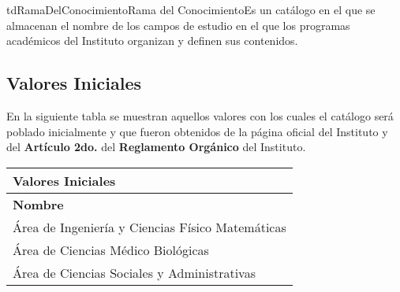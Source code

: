 \begin{TipoDeDato}{tdRamaDelConocimiento}{Rama del Conocimiento}{Es un catálogo en  el que se almacenan el nombre de los campos de estudio en el que los programas académicos del Instituto organizan y definen sus contenidos.}
	
	\begin{tdAtributos}
	\end{tdAtributos}

	\subsection{Valores Iniciales}
	
	En la siguiente tabla se muestran aquellos valores con los cuales el catálogo será poblado inicialmente y que fueron obtenidos de la página oficial del Instituto y del \textbf{Artículo 2do.} del \textbf{Reglamento Orgánico} del Instituto.
		
		\begin{longtable}{| p{}| }
	 			\rowcolor{colorPrincipal}
	 			\bf \color{white} Valores Iniciales\\
	 			\hline
	 			\rowcolor{colorSecundario}
	 			\bf \color{white} Nombre  \\
	 			\hline
	 			\hline
	 			Área de Ingeniería y Ciencias Físico Matemáticas\\
	 			\hline
	 			Área de Ciencias Médico Biológicas\\
	 			\hline
	 			Área de Ciencias Sociales y Administrativas\\
	 			\hline
	 		\end{longtable}
\end{TipoDeDato}


